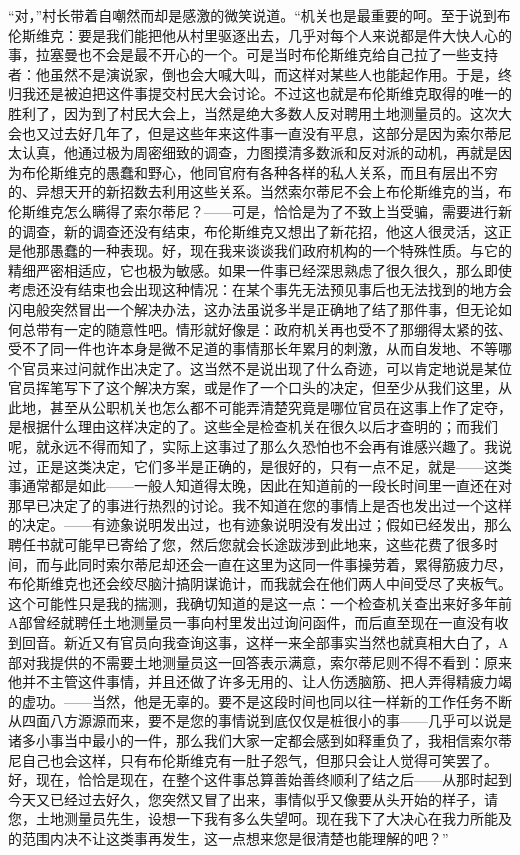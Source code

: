 \documentclass[12pt,a4paper]{article}
\begin{document}
“对，”村长带着自嘲然而却是感激的微笑说道。“机关也是最重要的呵。至于说到布伦斯维克：要是我们能把他从村里驱逐出去，几乎对每个人来说都是件大快人心的事，拉塞曼也不会是最不开心的一个。可是当时布伦斯维克给自己拉了一些支持者：他虽然不是演说家，倒也会大喊大叫，而这样对某些人也能起作用。于是，终归我还是被迫把这件事提交村民大会讨论。不过这也就是布伦斯维克取得的唯一的胜利了，因为到了村民大会上，当然是绝大多数人反对聘用土地测量员的。这次大会也又过去好几年了，但是这些年来这件事一直没有平息，这部分是因为索尔蒂尼太认真，他通过极为周密细致的调查，力图摸清多数派和反对派的动机，再就是因为布伦斯维克的愚蠢和野心，他同官府有各种各样的私人关系，而且有层出不穷的、异想天开的新招数去利用这些关系。当然索尔蒂尼不会上布伦斯维克的当，布伦斯维克怎么瞒得了索尔蒂尼？——可是，恰恰是为了不致上当受骗，需要进行新的调查，新的调查还没有结束，布伦斯维克又想出了新花招，他这人很灵活，这正是他那愚蠢的一种表现。好，现在我来谈谈我们政府机构的一个特殊性质。与它的精细严密相适应，它也极为敏感。如果一件事已经深思熟虑了很久很久，那么即使考虑还没有结束也会出现这种情况：在某个事先无法预见事后也无法找到的地方会闪电般突然冒出一个解决办法，这办法虽说多半是正确地了结了那件事，但无论如何总带有一定的随意性吧。情形就好像是：政府机关再也受不了那绷得太紧的弦、受不了同一件也许本身是微不足道的事情那长年累月的刺激，从而自发地、不等哪个官员来过问就作出决定了。这当然不是说出现了什么奇迹，可以肯定地说是某位官员挥笔写下了这个解决方案，或是作了一个口头的决定，但至少从我们这里，从此地，甚至从公职机关也怎么都不可能弄清楚究竟是哪位官员在这事上作了定夺，是根据什么理由这样决定的了。这些全是检查机关在很久以后才查明的；而我们呢，就永远不得而知了，实际上这事过了那么久恐怕也不会再有谁感兴趣了。我说过，正是这类决定，它们多半是正确的，是很好的，只有一点不足，就是——这类事通常都是如此——一般人知道得太晚，因此在知道前的一段长时间里一直还在对那早已决定了的事进行热烈的讨论。我不知道在您的事情上是否也发出过一个这样的决定。——有迹象说明发出过，也有迹象说明没有发出过；假如已经发出，那么聘任书就可能早已寄给了您，然后您就会长途跋涉到此地来，这些花费了很多时间，而与此同时索尔蒂尼却还会一直在这里为这同一件事操劳着，累得筋疲力尽，布伦斯维克也还会绞尽脑汁搞阴谋诡计，而我就会在他们两人中间受尽了夹板气。这个可能性只是我的揣测，我确切知道的是这一点：一个检查机关查出来好多年前A部曾经就聘任土地测量员一事向村里发出过询问函件，而后直至现在一直没有收到回音。新近又有官员向我查询这事，这样一来全部事实当然也就真相大白了，A部对我提供的不需要土地测量员这一回答表示满意，索尔蒂尼则不得不看到：原来他并不主管这件事情，并且还做了许多无用的、让人伤透脑筋、把人弄得精疲力竭的虚功。——当然，他是无辜的。要不是这段时间也同以往一样新的工作任务不断从四面八方源源而来，要不是您的事情说到底仅仅是桩很小的事——几乎可以说是诸多小事当中最小的一件，那么我们大家一定都会感到如释重负了，我相信索尔蒂尼自己也会这样，只有布伦斯维克有一肚子怨气，但那只会让人觉得可笑罢了。好，现在，恰恰是现在，在整个这件事总算善始善终顺利了结之后——从那时起到今天又已经过去好久，您突然又冒了出来，事情似乎又像要从头开始的样子，请您，土地测量员先生，设想一下我有多么失望呵。现在我下了大决心在我力所能及的范围内决不让这类事再发生，这一点想来您是很清楚也能理解的吧？”
\par{}
\newpage
\end{document}

